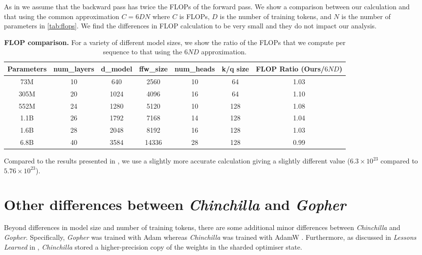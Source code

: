 \documentclass[11pt, a4paper, logo, copyright, nonumbering]{deepmind}
\newcommand{\gopher}{\textit{Gopher}\xspace}
\newcommand{\chinchilla}{\textit{Chinchilla}\xspace}
\begin{document}
As in \citet{kaplan2020scaling} we assume that the backward pass has twice the FLOPs of the forward pass.
We show a comparison between our calculation and that using the common approximation $C = 6 D N$ \citep{kaplan2020scaling} where $C$ is FLOPs, $D$ is the number of training tokens, and $N$ is the number of parameters in \autoref{tab:flops}.
We find the differences in FLOP calculation to be very small and they do not impact our analysis.
\begin{table}[h!]
\centering
\begin{tabular}{c c c c c c | c}
\toprule
Parameters & num\_layers & d\_model & ffw\_size & num\_heads & k/q size & FLOP Ratio (Ours/$6ND$)\\ 
\midrule
73M & 10 & 640 & 2560 & 10 & 64 & 1.03\\
305M & 20 & 1024 & 4096 & 16 & 64 & 1.10\\
552M & 24 & 1280 & 5120 & 10 & 128 & 1.08\\
1.1B & 26 & 1792 & 7168 & 14 & 128 & 1.04\\
1.6B & 28 & 2048 & 8192 & 16 & 128 & 1.03\\
6.8B & 40 & 3584 & 14336 & 28 & 128 & 0.99\\
\bottomrule
\end{tabular}
    \caption{\textbf{FLOP comparison.} 
    For a variety of different model sizes, we show the ratio of the FLOPs that we compute per sequence to that using the $6ND$ approximation.
    }
    \label{tab:flops}
\end{table}
Compared to the results presented in \citet{rae2021gopher}, we use a slightly more accurate calculation giving a slightly different value ($6.3 \times 10^{23}$ compared to $5.76 \times 10^{23}$).

\section{Other differences between \chinchilla and \gopher}
\label{app:other_diffs}
Beyond differences in model size and number of training tokens, there are some additional minor differences between \chinchilla and \gopher.
Specifically, \gopher was trained with Adam \citep{kingma2014adam} whereas \chinchilla was trained with AdamW \citep{loshchilov2018decoupled}.
Furthermore, as discussed in \textit{Lessons Learned} in \citet{rae2021gopher}, \chinchilla stored a higher-precision copy of the weights in the sharded optimiser state.
\end{document}
